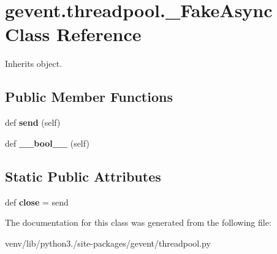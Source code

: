\hypertarget{classgevent_1_1threadpool_1_1___fake_async}{}\section{gevent.\+threadpool.\+\_\+\+Fake\+Async Class Reference}
\label{classgevent_1_1threadpool_1_1___fake_async}


Inherits object.

\subsection*{Public Member Functions}
\begin{DoxyCompactItemize}
\item 
\mbox{\label{classgevent_1_1threadpool_1_1___fake_async_ae444a0e3df9b55f72bc0adce1c4406fa}} 
def {\bfseries send} (self)
\item 
\mbox{\label{classgevent_1_1threadpool_1_1___fake_async_af4929c4802ca2166d2559af3b2ef8655}} 
def {\bfseries \+\_\+\+\_\+bool\+\_\+\+\_\+} (self)
\end{DoxyCompactItemize}
\subsection*{Static Public Attributes}
\begin{DoxyCompactItemize}
\item 
\mbox{\label{classgevent_1_1threadpool_1_1___fake_async_a23cce350ff6b1d71a4c00e81d920111b}} 
def {\bfseries close} = send
\end{DoxyCompactItemize}


The documentation for this class was generated from the following file\+:\begin{DoxyCompactItemize}
\item 
venv/lib/python3./site-\/packages/gevent/threadpool.\+py\end{DoxyCompactItemize}
